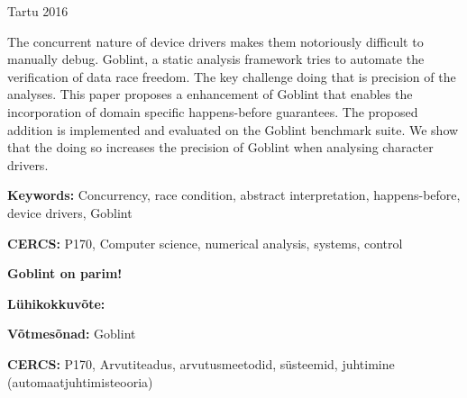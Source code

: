 \documentclass{style/master-thesis}
\begin{document}
\vfill
\centerline{Tartu 2016}



\pagebreak

\noindent\textbf{\large \articleName}
\vspace*{3ex}
{ The concurrent nature of device drivers makes them notoriously difficult to manually debug.
Goblint, a static analysis framework tries to automate the verification of data race freedom. The key challenge doing that is precision of the analyses.
This paper proposes a enhancement of Goblint that enables the incorporation of domain specific happens-before guarantees. 
The proposed addition is implemented and evaluated on the Goblint benchmark suite.
We show that the doing so increases the precision of Goblint when analysing character drivers.
}

\vspace*{3ex}
\begin{flushleft}
  \textbf{Keywords:} Concurrency, race condition, abstract interpretation, happens-before, device drivers, Goblint
\end{flushleft}
\vspace*{3ex}

\noindent\textbf{CERCS:} P170, Computer science, numerical analysis, systems, control

\vspace*{6ex}
\noindent\textbf{Goblint on parim!}
\vspace*{3ex}


\noindent\textbf{Lühikokkuvõte:} 
\vspace*{3ex}

\begin{flushleft}
  \textbf{Võtmesõnad:} Goblint
\end{flushleft}
\vspace*{3ex}

\noindent\textbf{CERCS:} P170, Arvutiteadus, arvutusmeetodid, süsteemid, juhtimine (automaatjuhtimisteooria)

\newpage




\tableofcontents
\end{document}
